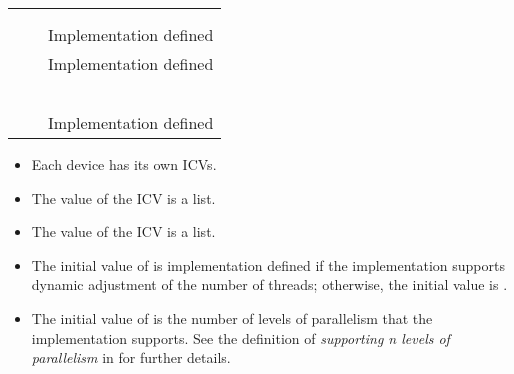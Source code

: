 \begin{supertabular}{p{1.4in} p{1.8in} p{1.5in}}
{}            & {}      & {}         \\
{}  & {}  & {}         \\
{}   & {}   & Implementation defined \\
{}    & {}    & Implementation defined \\
{}    & {}    & {}      \\
{} & {} & {}          \\
{}              & {}              & {}       \\
{}    & {}    & {}  \\
{}             & {}             & {}      \\
{}     & {}         & Implementation defined \\
\end{supertabular}

\linenumbers

\descr
\begin{itemize}
\item Each device has its own ICVs.

\item The value of the  ICV is a list.

\item The value of the  ICV is a list.

\item The initial value of  is implementation defined if the implementation supports
dynamic adjustment of the number of threads; otherwise, the initial value is .

\item The initial value of  is the number of levels of parallelism that
the implementation supports. See the definition of \emph{supporting n levels of parallelism}
in  for further details.
\end{itemize}

